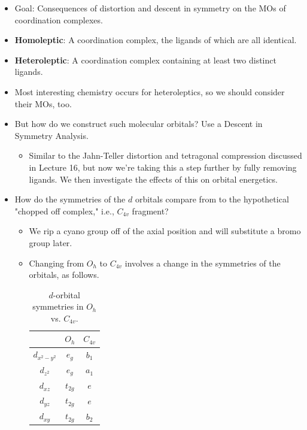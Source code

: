 \documentclass[../notes.tex]{subfiles}
\begin{document}
\begin{itemize}
    \item {}Goal: Consequences of distortion and descent in symmetry on the MOs of coordination complexes.
    \item \textbf{Homoleptic}: A coordination complex, the ligands of which are all identical.
    \item \textbf{Heteroleptic}: A coordination complex containing at least two distinct ligands.
    \item Most interesting chemistry occurs for heteroleptics, so we should consider their MOs, too.
    \item But how do we construct such molecular orbitals? Use a Descent in Symmetry Analysis.
    \begin{itemize}
        \item Similar to the Jahn-Teller distortion and tetragonal compression discussed in Lecture 16, but now we're taking this a step further by fully removing ligands. We then investigate the effects of this on orbital energetics.
    \end{itemize}
    \item How do the symmetries of the $d$ orbitals compare from  to the hypothetical "chopped off  complex," i.e., $C_{4v}$ fragment?
    \begin{itemize}
        \item We rip a cyano group off of the axial position and will substitute a bromo group later.
        \item Changing from $O_h$ to $C_{4v}$ involves a change in the symmetries of the orbitals, as follows.
        \begin{table}[h!]
            \centering
            \small
            \renewcommand{\arraystretch}{1.2}
            \begin{tabular}{c|c|c}
                 & $O_h$ & $C_{4v}$\\
                \hline
                $d_{x^2-y^2}$ & $e_g$ & $b_1$\\
                $d_{z^2}$ & $e_g$ & $a_1$\\
                $d_{xz}$ & $t_{2g}$ & $e$\\
                $d_{yz}$ & $t_{2g}$ & $e$\\
                $d_{xy}$ & $t_{2g}$ & $b_2$\\
            \end{tabular}
            \caption{$d$-orbital symmetries in $O_h$ vs. $C_{4v}$.}

\end{table}
\end{itemize}
\end{itemize}
\end{document}
